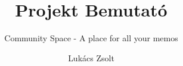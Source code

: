 \documentclass[aspectratio=43,11pt]{beamer}
\title{Projekt Bemutató}
\subtitle{Community Space - A place for all your memos}
\author{Lukács Zsolt}
\begin{document}
\frame{\titlepage}






\end{document}
